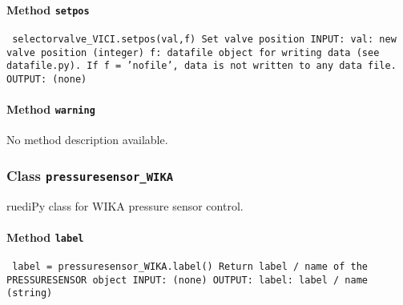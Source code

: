 \paragraph{Method \texttt{setpos}}
\vspace{1ex}
\texttt{\newline
selectorvalve_VICI.setpos(val,f)\newline
\newline
Set valve position\newline
\newline
INPUT:\newline
val: new valve position (integer)\newline
f: datafile object for writing data (see datafile.py). If f = 'nofile', data is not written to any data file.\newline
\newline
OUTPUT:\newline
(none)\newline
\newline
}

\paragraph{Method \texttt{warning}}
\vspace{1ex}
No method description available.\par

\subsubsection{Class \texttt{pressuresensor_WIKA}}
\par
ruediPy class for WIKA pressure sensor control.\par

\paragraph{Method \texttt{label}}
\vspace{1ex}
\texttt{\newline
label = pressuresensor_WIKA.label()\newline
\newline
Return label / name of the PRESSURESENSOR object\newline
\newline
INPUT:\newline
(none)\newline
\newline
OUTPUT:\newline
label: label / name (string)\newline
\newline
}

